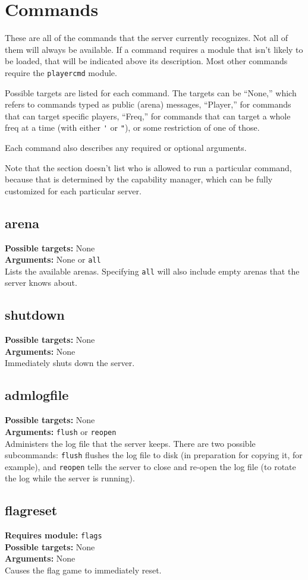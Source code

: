 \documentclass{article}
\newcommand{\requiremod}[1]{\noindent\textbf{Requires module:} \texttt{#1}\\}
\newcommand{\targets}[1]{\noindent\textbf{Possible targets:} #1\\}
\newcommand{\args}[1]{\noindent\textbf{Arguments:} #1\\}
\begin{document}
\section{Commands}

These are all of the commands that the server currently recognizes. Not
all of them will always be available. If a command requires a module
that isn't likely to be loaded, that will be indicated above its
description. Most other commands require the \texttt{playercmd} module.

Possible targets are listed for each command. The targets can be
``None,'' which refers to commands typed as public (arena) messages,
``Player,'' for commands that can target specific players, ``Freq,'' for
commands that can target a whole freq at a time (with either \verb/'/ or
\verb/"/), or some restriction of one of those.

Each command also describes any required or optional arguments.

Note that the section doesn't list who is allowed to run a particular
command, because that is determined by the capability manager, which can
be fully customized for each particular server.

\subsection{arena}
\targets{None}
\args{None or \texttt{all}}
Lists the available arenas. Specifying \texttt{all} will also include
empty arenas that the server knows about.

\subsection{shutdown}
\targets{None}
\args{None}
Immediately shuts down the server.

\subsection{admlogfile}
\targets{None}
\args{\texttt{flush} or \texttt{reopen}}
Administers the log file that the server keeps. There are two possible
subcommands: \verb/flush/ flushes the log file to disk (in preparation
for copying it, for example), and \verb/reopen/ tells the server to
close and re-open the log file (to rotate the log while the server is
running).

\subsection{flagreset}
\requiremod{flags}
\targets{None}
\args{None}
Causes the flag game to immediately reset.
\end{document}
